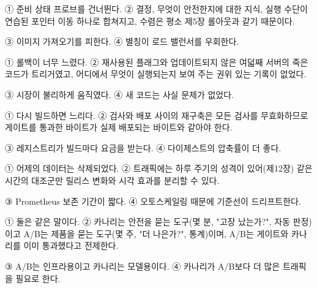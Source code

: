 
\begin{tbboptions}
  \item ① 준비 상태 프로브를 건너뛴다.        ② 결정, 무엇이 안전한지에 대한 지식, 실행 수단이 연습된 포인터 이동 하나로 합쳐지고, 수렴은 평소 제5장 롤아웃과 같기 때문이다.
  \item ③ 이미지 가져오기를 피한다.        ④ 별칭이 로드 밸런서를 우회한다.
\end{tbboptions}


\begin{tbboptions}
  \item ① 롤백이 너무 느렸다.        ② 재사용된 플래그와 업데이트되지 않은 여덟째 서버의 죽은 코드가 트리거였고, 어디에서 무엇이 실행되는지 보여 주는 권위 있는 기록이 없었다.
  \item ③ 시장이 불리하게 움직였다.        ④ 새 코드는 사실 문제가 없었다.
\end{tbboptions}


\begin{tbboptions}
  \item ① 다시 빌드하면 느리다.        ② 검사와 배포 사이의 재구축은 모든 검사를 무효화하므로 게이트를 통과한 바이트가 실제 배포되는 바이트와 같아야 한다.
  \item ③ 레지스트리가 빌드마다 요금을 받는다.        ④ 다이제스트의 압축률이 더 좋다.
\end{tbboptions}


\begin{tbboptions}
  \item ① 어제의 데이터는 삭제되었다.        ② 트래픽에는 하루 주기의 성격이 있어(제12장) 같은 시간의 대조군만 릴리스 변화와 시각 효과를 분리할 수 있다.
  \item ③ Prometheus 보존 기간이 짧다.        ④ 오토스케일링 때문에 기준선이 드리프트한다.
\end{tbboptions}


\begin{tbboptions}
  \item ① 둘은 같은 말이다.        ② 카나리는 안전을 묻는 도구(몇 분, "고장 났는가?", 자동 판정)이고 A/B는 제품을 묻는 도구(몇 주, "더 나은가?", 통계)이며, A/B는 게이트와 카나리를 이미 통과했다고 전제한다.
  \item ③ A/B는 인프라용이고 카나리는 모델용이다.        ④ 카나리가 A/B보다 더 많은 트래픽을 필요로 한다.
\end{tbboptions}

